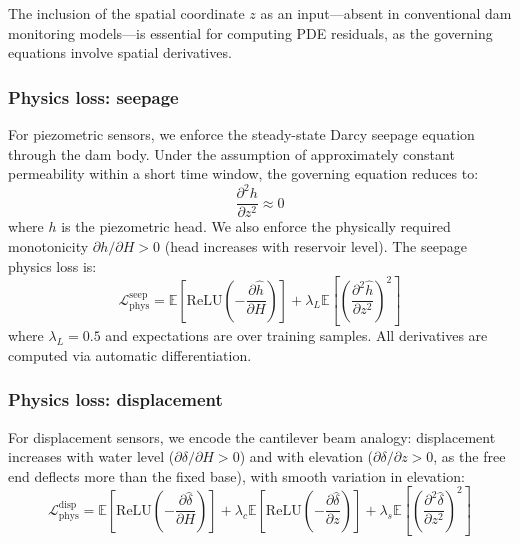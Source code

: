 \documentclass[preprint,12pt,review]{elsarticle}
\begin{document}
The inclusion of the spatial coordinate $z$ as an input---absent in conventional dam monitoring models---is essential for computing PDE residuals, as the governing equations involve spatial derivatives.

\subsubsection{Physics loss: seepage}

For piezometric sensors, we enforce the steady-state Darcy seepage equation through the dam body. Under the assumption of approximately constant permeability within a short time window, the governing equation reduces to:
\begin{equation}
\frac{\partial^2 h}{\partial z^2} \approx 0
\label{eq:darcy}
\end{equation}
where $h$ is the piezometric head. We also enforce the physically required monotonicity $\partial h / \partial H > 0$ (head increases with reservoir level). The seepage physics loss is:
\begin{equation}
\mathcal{L}_{\mathrm{phys}}^{\mathrm{seep}} = \mathbb{E}\left[\mathrm{ReLU}\!\left(-\frac{\partial \hat{h}}{\partial H}\right)\right] + \lambda_L \mathbb{E}\!\left[\left(\frac{\partial^2 \hat{h}}{\partial z^2}\right)^2\right]
\label{eq:seepage_loss}
\end{equation}
where $\lambda_L = 0.5$ and expectations are over training samples. All derivatives are computed via automatic differentiation.

\subsubsection{Physics loss: displacement}

For displacement sensors, we encode the cantilever beam analogy: displacement increases with water level ($\partial \delta / \partial H > 0$) and with elevation ($\partial \delta / \partial z > 0$, as the free end deflects more than the fixed base), with smooth variation in elevation:
\begin{equation}
\mathcal{L}_{\mathrm{phys}}^{\mathrm{disp}} = \mathbb{E}\!\left[\mathrm{ReLU}\!\left(-\frac{\partial \hat{\delta}}{\partial H}\right)\right] + \lambda_c \mathbb{E}\!\left[\mathrm{ReLU}\!\left(-\frac{\partial \hat{\delta}}{\partial z}\right)\right] + \lambda_s \mathbb{E}\!\left[\left(\frac{\partial^2 \hat{\delta}}{\partial z^2}\right)^2\right]
\label{eq:disp_loss}
\end{equation}
\end{document}
